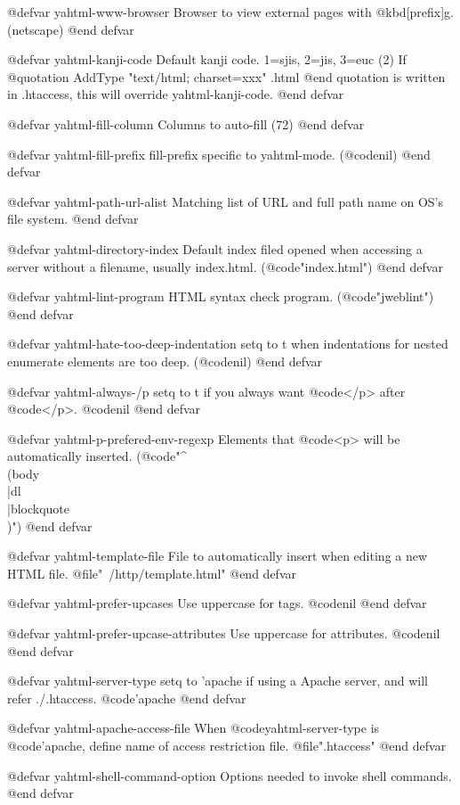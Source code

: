 {{@defvar yahtml-www-browser
Browser to view external pages with @kbd{[prefix]g}. (netscape)
@end defvar

@defvar yahtml-kanji-code
Default kanji code. 1=sjis, 2=jis, 3=euc (2)
If
@quotation
 AddType "text/html; charset=xxx" .html
@end quotation
is written in .htaccess, this will override yahtml-kanji-code.
@end defvar

@defvar yahtml-fill-column
Columns to auto-fill (72)
@end defvar

@defvar yahtml-fill-prefix
fill-prefix specific to yahtml-mode. (@code{nil})
@end defvar

@defvar yahtml-path-url-alist
Matching list of URL and full path name on OS's file system.
@end defvar

@defvar yahtml-directory-index
Default index filed opened when accessing a server without a filename,
usually index.html. (@code{"index.html"})
@end defvar

@defvar yahtml-lint-program
HTML syntax check program. (@code{"jweblint"})
@end defvar

@defvar yahtml-hate-too-deep-indentation
setq to t when indentations for nested enumerate elements are too deep.
(@code{nil})
@end defvar

@defvar yahtml-always-/p
setq to t if you always want @code{</p>} after @code{</p>}. @code{nil}
@end defvar

@defvar yahtml-p-prefered-env-regexp
Elements that @code{<p>} will be automatically inserted.
(@code{"^\\(body\\|dl\\|blockquote\\)"})
@end defvar

@defvar yahtml-template-file
File to automatically insert when editing a new HTML file.
@file{"~/http/template.html"}
@end defvar

@defvar yahtml-prefer-upcases
Use uppercase for tags. @code{nil}
@end defvar

@defvar yahtml-prefer-upcase-attributes
Use uppercase for attributes. @code{nil}
@end defvar

@defvar yahtml-server-type
setq to 'apache if using a Apache server, and will refer ./.htaccess.
@code{'apache}
@end defvar

@defvar yahtml-apache-access-file
When @code{yahtml-server-type} is @code{'apache}, define name of access
restriction file. @file{".htaccess"}
@end defvar

@defvar yahtml-shell-command-option
Options needed to invoke shell commands.
@end defvar

}}
